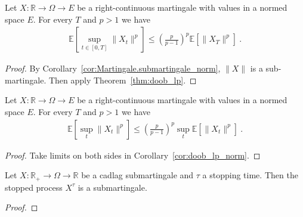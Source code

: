 \begin{corollary}\label{cor:doob_lp_norm}
  \leanok
  Let $X : \mathbb{R} \rightarrow \Omega\rightarrow E$ be a right-continuous martingale with values in a normed space $E$.
  For every $T$ and $p>1$ we have
  \begin{align*}
    \mathbb{E}\left[ \sup_{t\in[0,T]} \lVert X_t \rVert ^ p \right]
    \leq \left(\frac{p}{p-1}\right)^p\mathbb{E}[\lVert X_T \rVert ^p]
    \: .
  \end{align*}
\end{corollary}

\begin{proof}
  By Corollary~\ref{cor:Martingale.submartingale_norm}, $\lVert X \rVert$ is a sub-martingale.
  Then apply Theorem~\ref{thm:doob_lp}.
\end{proof}


\begin{corollary}\label{cor:doob_lp_norm_top}
  \leanok
  Let $X : \mathbb{R} \rightarrow \Omega\rightarrow E$ be a right-continuous martingale with values in a normed space $E$.
  For every $T$ and $p>1$ we have
  \begin{align*}
    \mathbb{E}\left[ \sup_t \lVert X_t \rVert ^ p \right]
    \leq \left(\frac{p}{p-1}\right)^p \sup_t \mathbb{E}[\lVert X_t \rVert ^p]
    \: .
  \end{align*}
\end{corollary}

\begin{proof}
  Take limits on both sides in Corollary~\ref{cor:doob_lp_norm}.
\end{proof}


\begin{lemma}\label{lem:Submartingale.stoppedProcess_of_cadlag}
  Let $X:\mathbb{R}_+ \to \Omega \to \mathbb{R}$ be a cadlag submartingale and $\tau$ a stopping time.
  Then the stopped process $X^\tau$ is a submartingale.
\end{lemma}

\begin{proof}

\end{proof}


